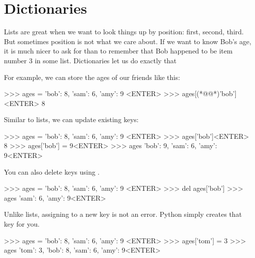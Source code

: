 \section{Dictionaries}

  Lists are great when we want to look
things up by position: first, second, third. But sometimes position is not what we care about. If we
want to know Bob’s age, it is much nicer to ask for  than to remember that Bob happened
to be item number 3 in some list. Dictionaries let us do exactly that

For example, we can store the ages of our friends like this:

\begin{replbox}
>>> ages = { 'bob': 8, 'sam': 6, 'amy': 9 }<ENTER>
>>> ages[(*@@*)'bob']<ENTER>
8
\end{replbox}

Similar to lists, we can update existing keys:

\begin{replbox}
>>> ages = { 'bob': 8, 'sam': 6, 'amy': 9 }<ENTER>
>>> ages['bob']<ENTER>
8
>>> ages['bob'] = 9<ENTER>
>>> ages
{'bob': 9, 'sam': 6, 'amy': 9}<ENTER>
\end{replbox}

You can also delete keys using .

\begin{replbox}
>>> ages = { 'bob': 8, 'sam': 6, 'amy': 9 }<ENTER>
>>> del ages['bob']
>>> ages
{'sam': 6, 'amy': 9}<ENTER>
\end{replbox}

Unlike lists, assigning to a new key is not an error. Python simply creates that key for you.

\begin{replbox}
>>> ages = { 'bob': 8, 'sam': 6, 'amy': 9 }<ENTER>
>>> ages['tom'] = 3
>>> ages
{'tom': 3, 'bob': 8, 'sam': 6, 'amy': 9}<ENTER>
\end{replbox}

